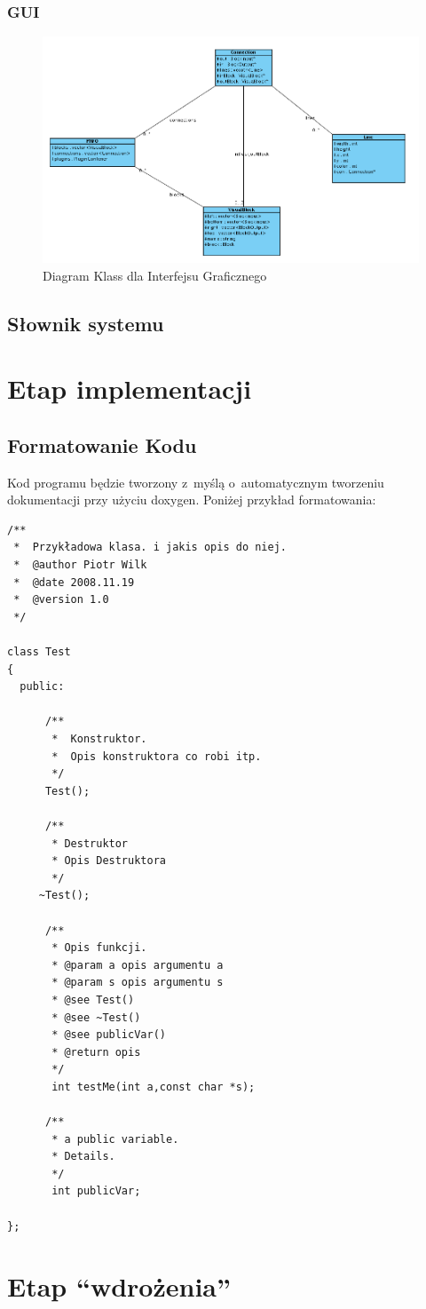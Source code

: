 \documentclass[a4paper,10pt]{article}
\begin{document}
\subsubsection{GUI}
\begin{figure}[h]
\begin{center}
\includegraphics[scale=0.5]{ClassDiagram-GUI}
\end{center}
\caption{Diagram Klass dla Interfejsu Graficznego}
\label{fig:ClassDiagram-GUI}
\end{figure}
\subsection{Słownik systemu}

\section{Etap implementacji}
\subsection{Formatowanie Kodu}
Kod programu będzie tworzony z~myślą o~automatycznym tworzeniu dokumentacji przy użyciu doxygen. Poniżej przykład formatowania:
\begin{verbatim}
/**
 *  Przykładowa klasa. i jakis opis do niej. 
 *  @author Piotr Wilk
 *  @date 2008.11.19
 *  @version 1.0
 */

class Test
{
  public:
      
      /**
       *  Konstruktor.
       *  Opis konstruktora co robi itp.
       */
      Test();

      /**
       * Destruktor
       * Opis Destruktora
       */
     ~Test();
    
      /**
       * Opis funkcji.
       * @param a opis argumentu a
       * @param s opis argumentu s 
       * @see Test()
       * @see ~Test()
       * @see publicVar()
       * @return opis 
       */
       int testMe(int a,const char *s);
       
      /** 
       * a public variable.
       * Details.
       */
       int publicVar;
       
};
\end{verbatim}
\section{Etap “wdrożenia”}
\end{document}
